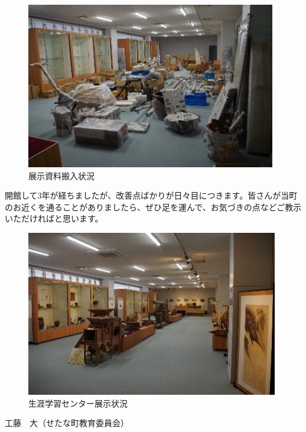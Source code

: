 \documentclass[a4j,11pt,twocolumn,openany]{jsbook}
\begin{document}
\begin{figure}[H]
	\centering
	\includegraphics[width=\linewidth]{fig/04_Kudo/fig03.jpg}
	\caption{展示資料搬入状況}
	\label{}
\end{figure}

開館して3年が経ちましたが、改善点ばかりが日々目につきます。皆さんが当町のお近くを通ることがありましたら、ぜひ足を運んで、お気づきの点などご教示いただければと思います。

\begin{figure}[H]
	\centering
	\includegraphics[width=\linewidth]{fig/04_Kudo/fig04.jpg}
	\caption{生涯学習センター展示状況}
	\label{}
\end{figure}

\begin{flushright}
工藤　大（せたな町教育委員会）
\end{flushright}
\end{document}
